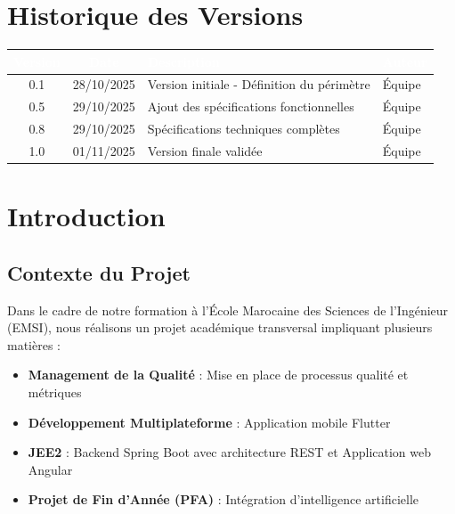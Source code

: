 \documentclass[12pt,a4paper]{report}
\begin{document}
\tableofcontents
\newpage

\chapter*{Historique des Versions}

\begin{tabularx}{\textwidth}{|c|c|X|l|}
    \hline
    \rowcolor{emsiblue}\textcolor{white}{\textbf{Version}} & \textcolor{white}{\textbf{Date}} & \textcolor{white}{\textbf{Description}} & \textcolor{white}{\textbf{Auteur}} \\
    \hline
    0.1 & 28/10/2025 & Version initiale - Définition du périmètre & Équipe \\
    \hline
    0.5 & 29/10/2025 & Ajout des spécifications fonctionnelles & Équipe \\
    \hline
    0.8 & 29/10/2025 & Spécifications techniques complètes & Équipe \\
    \hline
    1.0 & 01/11/2025 & Version finale validée & Équipe \\
    \hline
\end{tabularx}

\newpage

\chapter{Introduction}

\section{Contexte du Projet}

Dans le cadre de notre formation à l'École Marocaine des Sciences de l'Ingénieur (EMSI), nous réalisons un projet académique transversal impliquant plusieurs matières :
\begin{itemize}
    \item \textbf{Management de la Qualité} : Mise en place de processus qualité et métriques
    \item \textbf{Développement Multiplateforme} : Application mobile Flutter
    \item \textbf{JEE2} : Backend Spring Boot avec architecture REST et Application web Angular
    \item \textbf{Projet de Fin d'Année (PFA)} : Intégration d'intelligence artificielle
\end{itemize}
\end{document}
